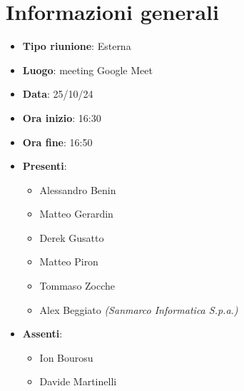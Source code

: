 \section{Informazioni generali}
\begin{itemize}
  \item \textbf{Tipo riunione}: Esterna
  \item \textbf{Luogo}: meeting Google Meet
  \item \textbf{Data}: 25/10/24
  \item \textbf{Ora inizio}: 16:30
  \item \textbf{Ora fine}: 16:50
  
  \item \textbf{Presenti}:
  \begin{itemize}
    \item Alessandro Benin
    \item Matteo Gerardin
    \item Derek Gusatto
    \item Matteo Piron
    \item Tommaso Zocche
    \item Alex Beggiato \textit{(Sanmarco Informatica S.p.a.)} 
  \end{itemize}

  \item \textbf{Assenti}:
  \begin{itemize}
      \item Ion Bourosu
      \item Davide Martinelli
  \end{itemize}
 
\end{itemize}